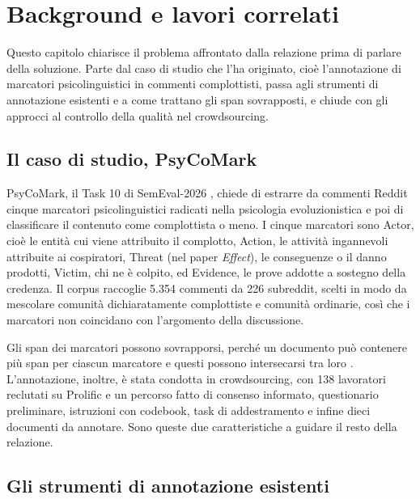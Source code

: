 \documentclass[]{sapthesis}
\begin{document}
\chapter{Background e lavori correlati}
\label{cap:background}

Questo capitolo chiarisce il problema affrontato dalla relazione prima di parlare della soluzione. Parte dal caso di studio che l'ha originato, cioè l'annotazione di marcatori psicolinguistici in commenti complottisti, passa agli strumenti di annotazione esistenti e a come trattano gli span sovrapposti, e chiude con gli approcci al controllo della qualità nel crowdsourcing.

\section{Il caso di studio, PsyCoMark}
\label{sec:psycomark}

PsyCoMark, il Task 10 di SemEval-2026 \parencite{samory2026psycomark}, chiede di estrarre da commenti Reddit cinque marcatori psicolinguistici radicati nella psicologia evoluzionistica e poi di classificare il contenuto come complottista o meno. I cinque marcatori sono Actor, cioè le entità cui viene attribuito il complotto, Action, le attività ingannevoli attribuite ai cospiratori, Threat (nel paper \emph{Effect}), le conseguenze o il danno prodotti, Victim, chi ne è colpito, ed Evidence, le prove addotte a sostegno della credenza. Il corpus raccoglie 5.354 commenti da 226 subreddit, scelti in modo da mescolare comunità dichiaratamente complottiste e comunità ordinarie, così che i marcatori non coincidano con l'argomento della discussione.

Gli span dei marcatori possono sovrapporsi, perché un documento può contenere più span per ciascun marcatore e questi possono intersecarsi tra loro \parencite{samory2026psycomark}. L'annotazione, inoltre, è stata condotta in crowdsourcing, con 138 lavoratori reclutati su Prolific e un percorso fatto di consenso informato, questionario preliminare, istruzioni con codebook, task di addestramento e infine dieci documenti da annotare. Sono queste due caratteristiche a guidare il resto della relazione.


\section{Gli strumenti di annotazione esistenti}
\label{sec:strumenti}
\end{document}
